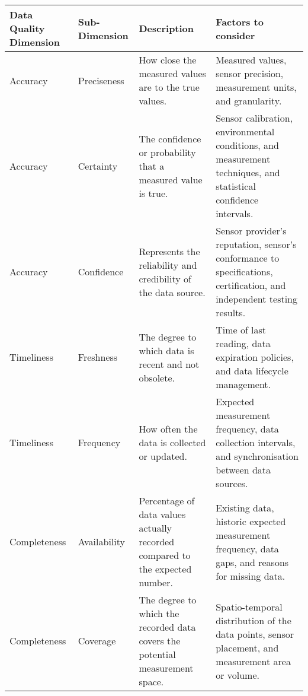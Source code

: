 \begin{table}[H]
    \centering
    \scriptsize %
    \begin{tabular}{|R{2cm}|R{2cm}|R{5cm}|R{5cm}|}
        \hline
        \textbf{Data Quality Dimension} & \textbf{Sub-Dimension} & \textbf{Description}                                                          & \textbf{Factors to consider}                                                                                          \\ \hline
        Accuracy                        & Preciseness            & How close the measured values are to the true values.                         & Measured values, sensor precision, measurement units, and granularity.                                                \\ \hline
        Accuracy                        & Certainty              & The confidence or probability that a measured value is true.                  & Sensor calibration, environmental conditions, and measurement techniques, and statistical confidence intervals.       \\ \hline
        Accuracy                        & Confidence             & Represents the reliability and credibility of the data source.                & Sensor provider's reputation, sensor's conformance to specifications, certification, and independent testing results. \\ \hline
        Timeliness                      & Freshness              & The degree to which data is recent and not obsolete.                          & Time of last reading, data expiration policies, and data lifecycle management.                                        \\ \hline
        Timeliness                      & Frequency              & How often the data is collected or updated.                                   & Expected measurement frequency, data collection intervals, and synchronisation between data sources.                  \\ \hline
        Completeness                    & Availability           & Percentage of data values actually recorded compared to the expected number.  & Existing data, historic expected measurement frequency, data gaps, and reasons for missing data.                      \\ \hline
        Completeness                    & Coverage               & The degree to which the recorded data covers the potential measurement space. & Spatio-temporal distribution of the data points, sensor placement, and measurement area or volume.                    \\ \hline

\end{tabular}
\end{table}
